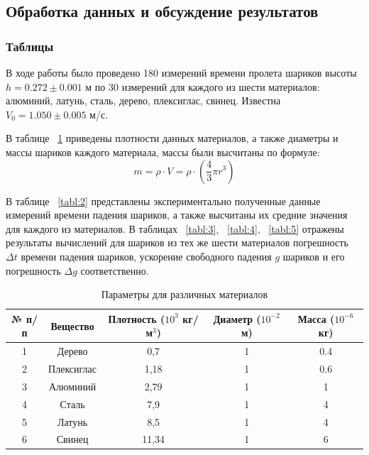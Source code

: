 \subsection{Обработка данных и обсуждение результатов}
 
\subsubsection{Таблицы}

В ходе работы было проведено 180 измерений времени пролета шариков высоты $h = 0.272 \pm 0.001$ м по 30 измерений для каждого из шести материалов: алюминий, латунь, сталь, дерево, плексиглас, свинец. Известна $V_0 = 1.050 \pm 0.005$ м/с.

В таблице ~\ref{tabl:1} приведены плотности данных материалов, а также диаметры и массы шариков каждого материала, массы были высчитаны по формуле:
\begin{equation}
\label{eq:10}
   m = \rho \cdot V = \rho \cdot \left(\frac{4}{3} \pi r^3 \right)
\end{equation}

В таблице ~\ref{tabl:2} представлены экспериментально полученные данные измерений времени падения шариков, а также высчитаны их средние значения для каждого из материалов. В таблицах ~\ref{tabl:3}, ~\ref{tabl:4}, ~\ref{tabl:5} отражены результаты вычислений для шариков из тех же шести материалов погрешность $\Delta t$ времени падения шариков, ускорение свободного падения $g$ шариков и его погрешность $\Delta g$ соответственно.

\begin{center}
\begin{table}[H]
\centering
\caption{Параметры для различных материалов}
\label{tabl:1}
\renewcommand{\arraystretch}{1.15}
\begin{tabular}{|c|c|c|c|c|}
\hline
{} № п/п & Вещество & Плотность ($10^3$ кг/м$^3$) & Диаметр ($10^{-2}$ м) & Масса ($10^{-6}$ кг) \\
\hline
1 & Дерево     & 0,7   & 1 &  0.4 \\
2 & Плексиглас & 1,18  & 1 &  0.6 \\
3 & Алюминий   & 2,79  & 1 &  1   \\
4 & Сталь      & 7,9   & 1 &  4   \\
5 & Латунь     & 8,5   & 1 &  4   \\
6 & Свинец     & 11,34 & 1 &  6   \\
\hline
\end{tabular}
\end{table}
\end{center}

